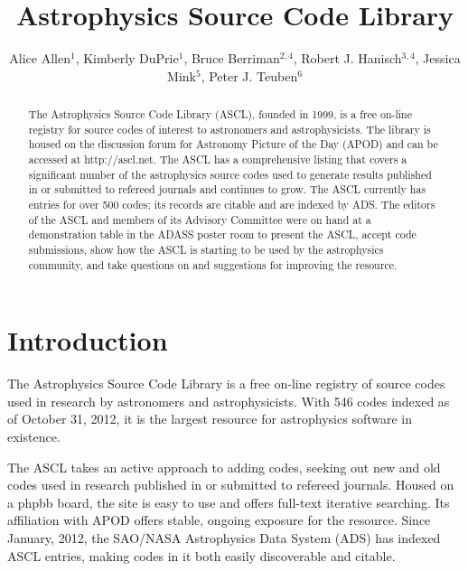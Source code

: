 \documentclass[11pt,twoside]{article}
\begin{document}
\title{Astrophysics Source Code Library}

\author{Alice Allen$^1$, Kimberly DuPrie$^1$, Bruce Berriman$^{2,4}$, Robert J. Hanisch$^{3,4}$, Jessica Mink$^5$, Peter J. Teuben$^6$
}

\begin{abstract}

The Astrophysics Source Code Library (ASCL), founded in 1999, is a
free on-line registry for source codes of interest to astronomers and
astrophysicists. The library is housed on the discussion forum for
Astronomy Picture of the Day (APOD) and can be accessed at
http://ascl.net. The ASCL has a comprehensive listing that covers a
significant number of the astrophysics source codes used to generate
results published in or submitted to refereed journals and continues
to grow. The ASCL currently has entries for over 500 codes; its
records are citable and are indexed by ADS. The editors of the ASCL
and members of its Advisory Committee were on hand at a demonstration table in the ADASS poster room to present
the ASCL, accept code submissions, show how the ASCL is starting to be
used by the astrophysics community, and take questions on and
suggestions for improving the resource.
\end{abstract}

\section{Introduction}

The Astrophysics Source Code Library is a free on-line registry of source codes used in research by astronomers and astrophysicists. With 546 codes indexed as of October 31, 2012, it is the largest resource for astrophysics software in existence. 

The ASCL takes an active approach to adding codes, seeking out new and old codes used in research published in or submitted to refereed journals. Housed on a phpbb board, the site is easy to use and offers full-text iterative searching. Its affiliation with APOD offers stable, ongoing exposure for the resource. Since January, 2012, the SAO/NASA Astrophysics Data System (ADS) has indexed ASCL entries, making codes in it both easily discoverable and citable.
\end{document}
